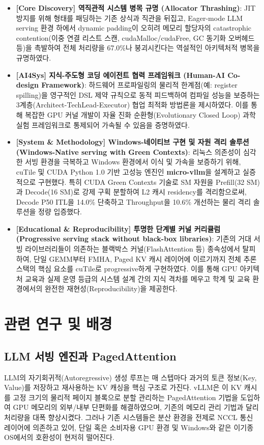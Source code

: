 \documentclass[preprint]{kcc} %
\begin{document}
\begin{itemize}
    \item \textbf{[Core Discovery] 역직관적 시스템 병목 규명 (Allocator Thrashing)}: JIT 방지를 위해 형태를 패딩하는 기존 상식과 직관을 뒤집고, Eager-mode LLM serving 환경 하에서 dynamic padding이 오히려 메모리 할당자의 catastrophic contention(이중 연결 리스트 스캔, cudaMalloc/cudaFree, GC 동기화 오버헤드 등)을 촉발하여 전체 처리량을 67.0\%나 붕괴시킨다는 역설적인 아키텍처적 병목을 규명하였다.
    \item \textbf{[AI4Sys] 지식-주도형 코딩 에이전트 협력 프레임워크 (Human-AI Co-design Framework)}: 하드웨어 프로파일링의 물리적 한계점(예: register spilling)을 영구적인 DSL 제약 규칙으로 동적 피드백하여 컴파일 성능을 보증하는 3계층(Architect-TechLead-Executor) 협업 최적화 방법론을 제시하였다. 이를 통해 복잡한 GPU 커널 개발이 자율 진화 순환형(Evolutionary Closed Loop) 과학실험 프레임워크로 통제되어 가속될 수 있음을 증명하였다.
    \item \textbf{[System \& Methodology] Windows-네이티브 구현 및 자원 격리 솔루션 (Windows-Native serving with Green Contexts)}: 리눅스 의존성이 심각한 서빙 환경을 극복하고 Windows 환경에서 이식 및 가속을 보증하기 위해, cuTile 및 CUDA Python 1.0 기반 고성능 엔진인 \textbf{micro-vllm}을 설계하고 실증적으로 구현했다. 특히 CUDA Green Contexts 기술로 SM 자원을 Prefill(32 SM)과 Decode(16 SM)로 강제 구획 분할하여 L2 캐시 residency를 격리함으로써, Decode P50 ITL을 14.0\% 단축하고 Throughput을 10.6\% 개선하는 물리 격리 솔루션을 정량 입증했다.
    \item \textbf{[Educational \& Reproducibility] 투명한 단계별 커널 커리큘럼 (Progressive serving stack without black-box libraries)}: 기존의 거대 서빙 라이브러리들이 의존하는 블랙박스 커널(FlashAttention 등) 종속성에서 탈피하여, 단일 GEMM부터 FMHA, Paged KV 캐시 레이어에 이르기까지 전체 추론 스택의 핵심 요소를 cuTile로 progressive하게 구현하였다. 이를 통해 GPU 아키텍처 교육과 실제 운영 등급의 시스템 설계 간의 지식 격차를 메우고 학계 및 교육 환경에서의 완전한 재현성(Reproducibility)을 제공한다.
\end{itemize}


\section{관련 연구 및 배경}
\subsection{LLM 서빙 엔진과 PagedAttention}
LLM의 자기회귀적(Autoregressive) 생성 루프는 매 스텝마다 과거의 토큰 정보(Key, Value)를 저장하고 재사용하는 KV 캐싱을 핵심 구조로 가진다. vLLM은 이 KV 캐시를 고정 크기의 물리적 페이지 블록으로 분할 관리하는 PagedAttention 기법을 도입하여 GPU 메모리의 외부/내부 단편화를 해결하였으며, 기존의 메모리 관리 기법과 달리 처리량을 대폭 향상시켰다. 그러나 기존 시스템들은 분산 환경을 전제로 NCCL 통신 레이어에 의존하고 있어, 단일 혹은 소비자용 GPU 환경 및 Windows와 같은 이기종 OS에서의 호환성이 현저히 떨어진다.
\end{document}
